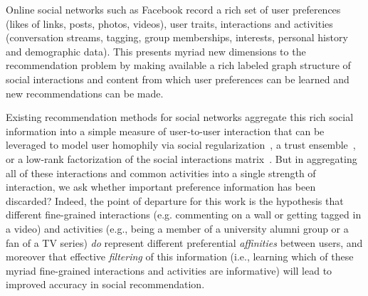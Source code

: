 
\label{sec:introduction}

Online social networks such as Facebook record a rich set of user
preferences (likes of links, posts, photos, videos), user traits,
interactions and activities (conversation streams, tagging, group
memberships, interests, personal history and demographic data).  This
presents myriad new dimensions to the recommendation problem by making
available a rich labeled graph structure of social interactions and
content from which user preferences can be learned and new
recommendations can be made.

Existing recommendation methods for social networks aggregate this
rich social information into a simple measure of user-to-user interaction 
that can be leveraged to model user homophily via social
regularization~\cite{lla,socinf,sr,rrmf, Noel2012NOF}, a trust
ensemble~\cite{ste}, or a low-rank factorization of the social
interactions matrix~\cite{sorec}.  But in aggregating all of these
interactions and common activities into a single strength of
interaction, we 
ask whether important preference information has been discarded?
Indeed, the point of departure for this work is the hypothesis that
different fine-grained interactions (e.g. commenting on a wall or
getting tagged in a video) and activities (e.g., being a member of a
university alumni group or a fan of a TV series) \emph{do} represent
different preferential {\em affinities} between users, and moreover
that effective {\em filtering} of this information (i.e., learning
which of these myriad fine-grained interactions and activities are 
informative) will lead to improved accuracy in social recommendation.


